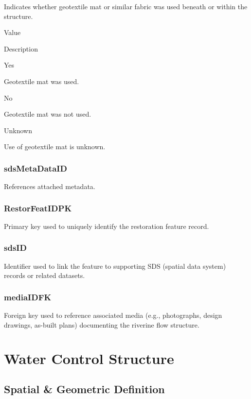 \documentclass[
  letterpaper,
  DIV=11,
  numbers=noendperiod]{scrreprt}
\begin{document}
Indicates whether geotextile mat or similar fabric was used beneath or
within the structure.

Value

Description

Yes

Geotextile mat was used.

No

Geotextile mat was not used.

Unknown

Use of geotextile mat is unknown.

\subsection{sdsMetaDataID}\label{sdsmetadataid-13}

References attached metadata.

\subsection{RestorFeatIDPK}\label{restorfeatidpk-13}

Primary key used to uniquely identify the restoration feature record.

\subsection{sdsID}\label{sdsid-13}

Identifier used to link the feature to supporting SDS (spatial data
system) records or related datasets.

\subsection{mediaIDFK}\label{mediaidfk-13}

Foreign key used to reference associated media (e.g., photographs,
design drawings, as-built plans) documenting the riverine flow
structure.

\chapter{Water Control Structure}\label{water-control-structure}

\section{Spatial \& Geometric
Definition}\label{spatial-geometric-definition-14}
\end{document}
